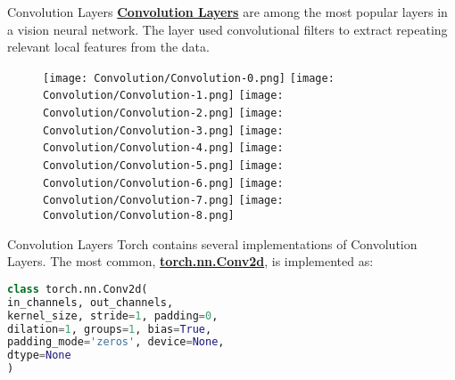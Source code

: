 \documentclass{beamer}
\begin{document}
\begin{frame}[fragile]{Convolution Layers}
    \href{https://pytorch.org/docs/stable/nn.html#convolution-layers}{\textbf{Convolution Layers}} are among the most popular layers in a vision neural network. The layer used convolutional filters to extract repeating relevant local features from the data.
    \begin{figure}
        \begin{overprint}
            \centering\texttt{[image: Convolution/Convolution-0.png]}
            \centering\texttt{[image: Convolution/Convolution-1.png]}
            \centering\texttt{[image: Convolution/Convolution-2.png]}
            \centering\texttt{[image: Convolution/Convolution-3.png]}
            \centering\texttt{[image: Convolution/Convolution-4.png]}
            \centering\texttt{[image: Convolution/Convolution-5.png]}
            \centering\texttt{[image: Convolution/Convolution-6.png]}
            \centering\texttt{[image: Convolution/Convolution-7.png]}
            \centering\texttt{[image: Convolution/Convolution-8.png]}
        \end{overprint}
    \end{figure}
\end{frame}
\begin{frame}[fragile]{Convolution Layers}
    Torch contains several implementations of Convolution Layers. The most common, \href{https://pytorch.org/docs/stable/generated/torch.nn.Conv2d.html}{\textbf{torch.nn.Conv2d}}, is implemented as:
    \begin{exampleblock}{}
        \begin{lstlisting}[language=Python]
class torch.nn.Conv2d(
in_channels, out_channels,
kernel_size, stride=1, padding=0,
dilation=1, groups=1, bias=True,
padding_mode='zeros', device=None,
dtype=None
)
        \end{lstlisting}
    \end{exampleblock}
\end{frame}
\end{document}

